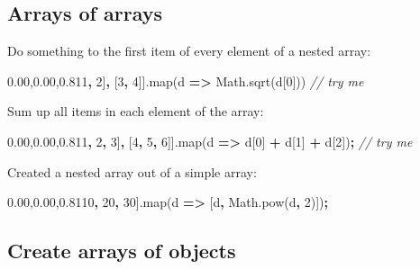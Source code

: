 \documentclass[openany]{book}
\newenvironment{Shaded}{\begin{snugshade}}{\end{snugshade}}
\newcommand{\AttributeTok}[1]{\textcolor[rgb]{0.77,0.63,0.00}{#1}}
\newcommand{\CommentTok}[1]{\textcolor[rgb]{0.56,0.35,0.01}{\textit{#1}}}
\newcommand{\DecValTok}[1]{\textcolor[rgb]{0.00,0.00,0.81}{#1}}
\newcommand{\NormalTok}[1]{#1}
\newcommand{\OperatorTok}[1]{\textcolor[rgb]{0.81,0.36,0.00}{\textbf{#1}}}
\newcommand{\VariableTok}[1]{\textcolor[rgb]{0.00,0.00,0.00}{#1}}
\begin{document}
\hypertarget{arrays-of-arrays-1}{%
\subsection{Arrays of arrays}\label{arrays-of-arrays-1}}

Do something to the first item of every element of a nested array:

\begin{Shaded}
\begin{Highlighting}[]
\NormalTok{[[}\DecValTok{1}\OperatorTok{,} \DecValTok{2}\NormalTok{]}\OperatorTok{,}\NormalTok{ [}\DecValTok{3}\OperatorTok{,} \DecValTok{4}\NormalTok{]].}\AttributeTok{map}\NormalTok{(d }\OperatorTok{=>} \VariableTok{Math}\NormalTok{.}\AttributeTok{sqrt}\NormalTok{(d[}\DecValTok{0}\NormalTok{]))  }\CommentTok{// try me}
\end{Highlighting}
\end{Shaded}

Sum up all items in each element of the array:

\begin{Shaded}
\begin{Highlighting}[]
\NormalTok{[[}\DecValTok{1}\OperatorTok{,} \DecValTok{2}\OperatorTok{,} \DecValTok{3}\NormalTok{]}\OperatorTok{,}\NormalTok{ [}\DecValTok{4}\OperatorTok{,} \DecValTok{5}\OperatorTok{,} \DecValTok{6}\NormalTok{]].}\AttributeTok{map}\NormalTok{(d }\OperatorTok{=>}\NormalTok{ d[}\DecValTok{0}\NormalTok{] }\OperatorTok{+}\NormalTok{ d[}\DecValTok{1}\NormalTok{] }\OperatorTok{+}\NormalTok{ d[}\DecValTok{2}\NormalTok{])}\OperatorTok{;} \CommentTok{// try me}
\end{Highlighting}
\end{Shaded}

Created a nested array out of a simple array:

\begin{Shaded}
\begin{Highlighting}[]
\NormalTok{[}\DecValTok{10}\OperatorTok{,} \DecValTok{20}\OperatorTok{,} \DecValTok{30}\NormalTok{].}\AttributeTok{map}\NormalTok{(d }\OperatorTok{=>}\NormalTok{ [d}\OperatorTok{,} \VariableTok{Math}\NormalTok{.}\AttributeTok{pow}\NormalTok{(d}\OperatorTok{,} \DecValTok{2}\NormalTok{)])}\OperatorTok{;}
\end{Highlighting}
\end{Shaded}

\hypertarget{create-arrays-of-objects}{%
\subsection{Create arrays of objects}\label{create-arrays-of-objects}}
\end{document}
